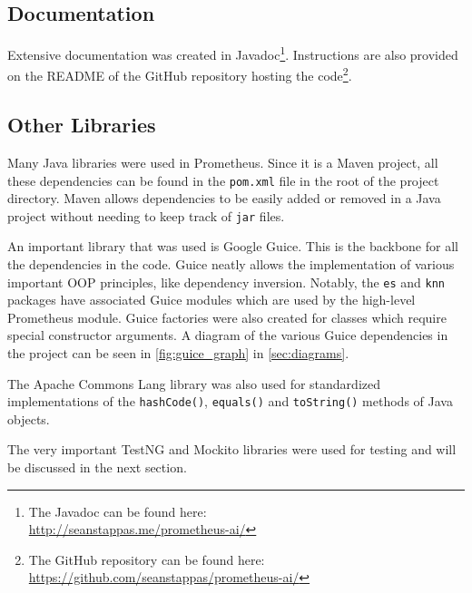 \documentclass[titlepage,11pt]{article}
\newcommand{\code}[1]{\texttt{#1}}
\begin{document}
\subsection{Documentation}
Extensive documentation was created in Javadoc\footnote{The Javadoc can be found here:\\ \url{http://seanstappas.me/prometheus-ai/}}. Instructions are also provided on the README of the GitHub repository hosting the code\footnote{The GitHub repository can be found here:\\ \url{https://github.com/seanstappas/prometheus-ai/}}.

\subsection{Other Libraries}
Many Java libraries were used in Prometheus. Since it is a Maven project, all these dependencies can be found in the \code{pom.xml} file in the root of the project directory. Maven allows dependencies to be easily added or removed in a Java project without needing to keep track of \code{jar} files.

An important library that was used is Google Guice. This is the backbone for all the dependencies in the code. Guice neatly allows the implementation of various important OOP principles, like dependency inversion. Notably, the \code{es} and \code{knn} packages have associated Guice modules which are used by the high-level Prometheus module. Guice factories were also created for classes which require special constructor arguments. A diagram of the various Guice dependencies in the project can be seen in \cref{fig:guice_graph} in \cref{sec:diagrams}.

The Apache Commons Lang library was also used for standardized implementations of the \code{hashCode()}, \code{equals()} and \code{toString()} methods of Java objects.

The very important TestNG and Mockito libraries were used for testing and will be discussed in the next section.
\end{document}
